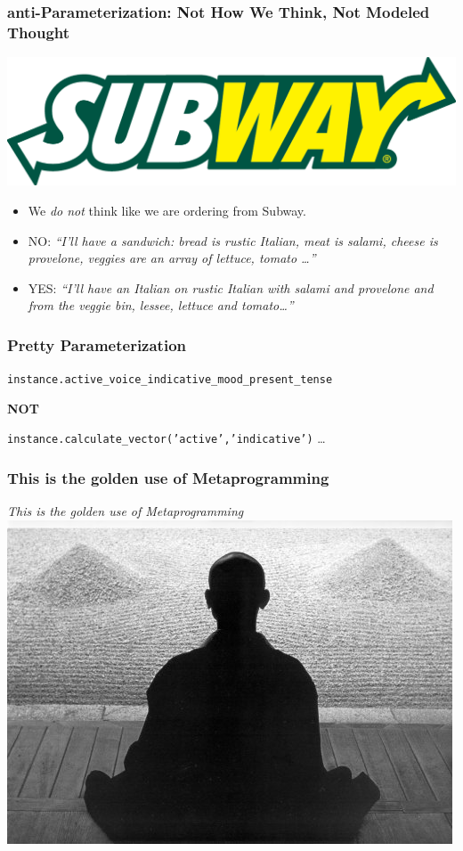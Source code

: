 \documentclass[slidestop,compress,mathserif]{beamer}
\begin{document}
\begin{frame}
	\frametitle{anti-Parameterization:  Not How We Think, Not Modeled Thought}

		\begin{center}
			\includegraphics[scale=0.15]{img/SubwayLogo.png}
		\end{center}			

	\begin{itemize}
		\item We \emph{do not} think like we are ordering from Subway.
		\pause
		\item NO:  \emph{``I'll have a sandwich:  bread is rustic Italian, meat is salami, cheese is provelone, veggies are an array of lettuce, tomato \ldots''}
		\pause
		\item YES:  \emph{``I'll have an Italian on rustic Italian with salami and provelone and from the veggie bin, lessee, lettuce and tomato\ldots''}
	\end{itemize}
	
\end{frame}

\begin{frame}
	\frametitle{Pretty Parameterization}		
	\texttt{instance.active\_voice\_indicative\_mood\_present\_tense}
	\begin{center}
		\textbf{NOT}
	\end{center}
	\texttt{instance.calculate\_vector('active','indicative')} \ldots
\end{frame}

\begin{frame}
	\frametitle{This is the golden use of Metaprogramming}
	\begin{center}
		\emph{This is the golden use of Metaprogramming}
		\includegraphics[scale=0.45]{img/Zen04.jpg}	
	\end{center}
\end{frame}
\end{document}
